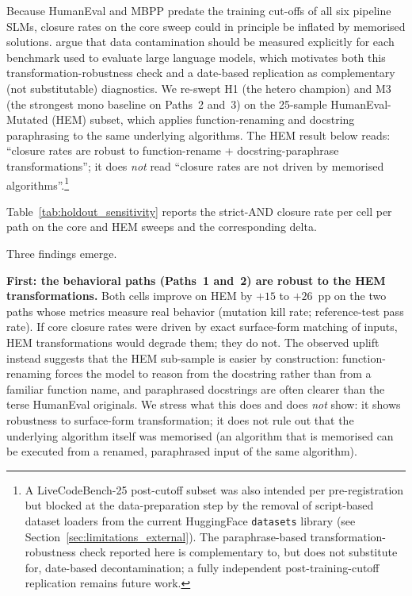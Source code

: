 Because HumanEval and MBPP predate the training cut-offs of all six pipeline SLMs, closure rates on the core sweep could in principle be inflated by memorised solutions. \citet{Sainz2023Contamination} argue that data contamination should be measured explicitly for each benchmark used to evaluate large language models, which motivates both this transformation-robustness check and a date-based replication as complementary (not substitutable) diagnostics. We re-swept H1 (the hetero champion) and M3 (the strongest mono baseline on Paths~2 and~3) on the 25-sample HumanEval-Mutated (HEM) subset, which applies function-renaming and docstring paraphrasing to the same underlying algorithms. The HEM result below reads: ``closure rates are robust to function-rename + docstring-paraphrase transformations''; it does \emph{not} read ``closure rates are not driven by memorised algorithms''.\footnote{A LiveCodeBench-25 post-cutoff subset was also intended per pre-registration but blocked at the data-preparation step by the removal of script-based dataset loaders from the current HuggingFace \texttt{datasets} library (see Section~\ref{sec:limitations_external}). The paraphrase-based transformation-robustness check reported here is complementary to, but does not substitute for, date-based decontamination; a fully independent post-training-cutoff replication remains future work.}

Table~\ref{tab:holdout_sensitivity} reports the strict-AND closure rate per cell per path on the core and HEM sweeps and the corresponding delta.

Three findings emerge.

\textbf{First: the behavioral paths (Paths~1 and~2) are robust to the HEM transformations.} Both cells improve on HEM by $+15$ to $+26$~pp on the two paths whose metrics measure real behavior (mutation kill rate; reference-test pass rate). If core closure rates were driven by exact surface-form matching of inputs, HEM transformations would degrade them; they do not. The observed uplift instead suggests that the HEM sub-sample is easier by construction: function-renaming forces the model to reason from the docstring rather than from a familiar function name, and paraphrased docstrings are often clearer than the terse HumanEval originals. We stress what this does and does \emph{not} show: it shows robustness to surface-form transformation; it does not rule out that the underlying algorithm itself was memorised (an algorithm that is memorised can be executed from a renamed, paraphrased input of the same algorithm).

